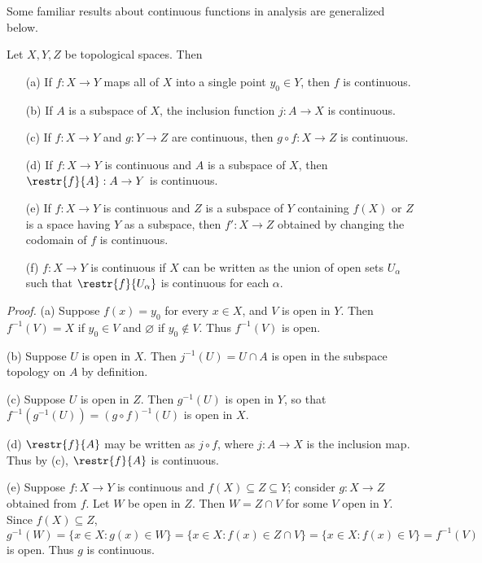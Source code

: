 Some familiar results about continuous functions in analysis are generalized below.
\begin{theorem}\label{2.38}
    Let $X, Y, Z$ be topological spaces. Then
    \begin{enumerate}
        \item[(a)] If $f: X \rightarrow Y$ maps all of $X$ into a single point $y_0 \in Y$, then $f$ is continuous.
        \item[(b)] If $A$ is a subspace of $X$, the inclusion function $j: A \rightarrow X$ is continuous.
        \item[(c)] If $f: X \rightarrow Y$ and $g: Y \rightarrow Z$ are continuous, then $g \circ f: X \rightarrow Z$ is continuous.
        \item[(d)] If $f: X \rightarrow Y$ is continuous and $A$ is a subspace of $X$, then $\restr{f}{A}: A \rightarrow Y$ is continuous.
        \item[(e)] If $f: X \rightarrow Y$ is continuous and $Z$ is a subspace of $Y$ containing $f(X)$ or $Z$ is a space having $Y$ as a subspace, then $f': X \rightarrow Z$ obtained by changing the codomain of $f$ is continuous.
        \item[(f)] $f: X \rightarrow Y$ is continuous if $X$ can be written as the union of open sets $U_\alpha$ such that $\restr{f}{U_\alpha}$ is continuous for each $\alpha$.
    \end{enumerate}
\end{theorem}
{\it Proof.} (a) Suppose $f(x) = y_0$ for every $x \in X$, and $V$ is open in $Y$. Then $f^{-1}(V) =X$ if $y_0 \in V$ and $\varnothing$ if $y_0 \notin V$. Thus $f^{-1}(V)$ is open.

(b) Suppose $U$ is open in $X$. Then $j^{-1}(U) = U \cap A$ is open in the subspace topology on $A$ by definition.

(c) Suppose $U$ is open in $Z$. Then $g^{-1}(U)$ is open in $Y$, so that $f^{-1}(g^{-1}(U)) = (g\circ f)^{-1}(U)$ is open in $X$.

(d) $\restr{f}{A}$ may be written as $j \circ f$, where $j: A \rightarrow X$ is the inclusion map. Thus by (c), $\restr{f}{A}$ is continuous.

(e) Suppose $f: X \rightarrow Y$ is continuous and $f(X) \subseteq Z \subseteq Y$; consider $g: X \rightarrow Z$ obtained from $f$. Let $W$ be open in $Z$. Then $W = Z \cap V$ for some $V$ open in $Y$. Since $f(X) \subseteq Z$, 
$$g^{-1}(W) = \{x \in X: g(x) \in W\} = \{x \in X: f(x) \in Z \cap V\} = \{x \in X: f(x) \in V\} = f^{-1}(V)$$
is open. Thus $g$ is continuous.

